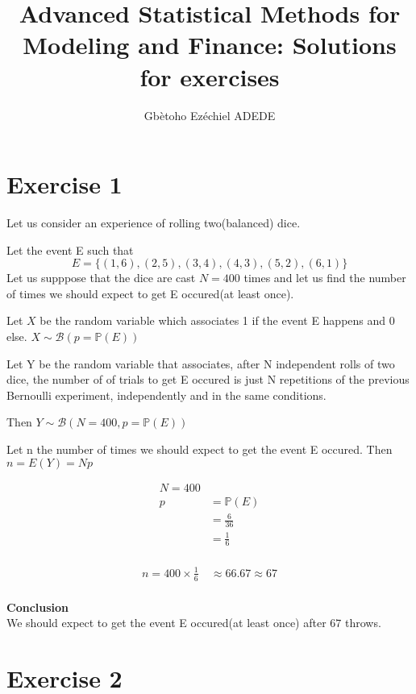 \documentclass[11pt]{article}
\title{Advanced Statistical Methods for Modeling and Finance: Solutions for exercises}
\author{Gbètoho Ezéchiel ADEDE}
\begin{document}
    
    \maketitle
    \newpage

    \section{Exercise 1}
  Let us consider an experience of rolling two(balanced) dice.
  
  
  Let the event E such that
\begin{equation*}
E=\{(1,6),(2,5),(3,4),(4,3),(5,2),(6,1)\}
\end{equation*} 
Let us supppose that the dice are cast $N=400$ times and let us find the number of times we should expect to get E occured(at least once).

Let $X$ be the random variable which associates 1 if the event E happens and 0 else. $X  \sim \mathcal B(p=\mathbb{P}(E))$ 

Let Y be the random variable that associates, after N independent rolls of two dice, the number of of trials to get E occured is just N repetitions of the previous Bernoulli experiment, independently and in the same conditions.

Then $Y  \sim \mathcal B(N=400,p=\mathbb{P}(E))$

Let n the number of times we should expect to get the event E occured. Then $n=E(Y)=Np$



\begin{align*}
N=400\\
p
&=\mathbb{P}(E)\\
&=\frac{6}{36}\\
&=\frac{1}{6}\\
\end{align*}

\begin{align*}
n=400\times \frac{1}{6}\
& \approx 66.67\approx 67\\
\end{align*}

\textbf{Conclusion}\\

We should expect to get the event E occured(at least once) after $67$ throws.


\newpage  
    \section{Exercise 2}
   
\end{document}
